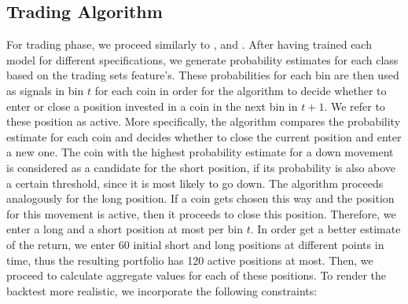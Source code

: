 \subsection{Trading Algorithm} \label{ch:trading_algorithm}
For trading phase, we proceed similarly to 
\cite{krauss2019statisticalArbitrage}, \cite{gatev2006pairsTrading} and \cite{krauss2016arbitrageSandP}.
After having trained each model for different specifications, we generate probability estimates for each class
based on the trading sets feature's. These probabilities for each bin are then used as signals in bin $t$ for each coin
in order for the algorithm to decide whether to enter or close a position invested in a coin in the next bin in $ t + 1 $.
We refer to these position as active.
More specifically, the algorithm compares the probability estimate for each coin and decides 
whether to close the current position and enter a new one. The coin with the highest probability estimate for a down movement
is considered as a candidate for the short position, if its probability is also above a certain threshold,
since it is most likely to go down. 
The algorithm proceeds analogously for the long position. 
If a coin gets chosen this way and the position for this movement is active, then it proceeds to close this position.
Therefore, we enter a long and a short position at most per bin $ t $.
In order get a better estimate of the return, we enter 60 initial short and long positions at different points in time,
thus the resulting portfolio has 120 active positions at most.
Then, we proceed to calculate aggregate values for each of these positions. To render the backtest more
realistic, we incorporate the following constraints:
